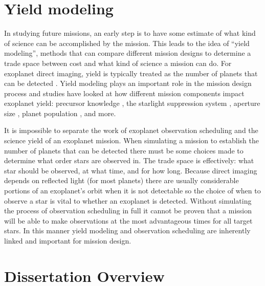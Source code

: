 \section{Yield modeling}
\label{sec:intro_yield_modeling}

In studying future missions, an early step is to have some estimate of what
kind of science can be accomplished by the mission. This leads to the idea of
``yield modeling'', methods that can compare different mission designs to
determine a trade space between cost and what kind of science a mission can do.
For exoplanet direct imaging, yield is typically treated as the number of
planets that can be detected
\citep{brownSingleVisitPhotometric2005,savranskyAnalyzingDesignsPlanetFinding2010,
starkMaximizingExoEarthCandidate2014}. Yield modeling plays an important role
in the mission design process and studies have looked at how different
mission components impact exoplanet yield: precursor knowledge
\citep{morganFasterExoEarth2021}, the starlight suppression system
\citep{savranskyAnalyzingDesignsPlanetFinding2010,morgan19, Stark2016},
aperture size \citep{starkLowerLimitsAperture2015}, planet population
\citep{savranskyComparisonAnalyticalDepth2016}, and more. 

It is impossible to separate the work of exoplanet observation scheduling and
the science yield of an exoplanet mission. When simulating a mission to
establish the number of planets that can be detected there must be some choices
made to determine what order stars are observed in. The trade space is
effectively: what star should be observed, at what time, and for how long. Because
direct imaging depends on reflected light (for most planets) there are usually
considerable portions of an exoplanet's orbit when it is not detectable so the
choice of when to observe a star is vital to whether an exoplanet is detected.
Without simulating the process of observation scheduling in full it cannot be
proven that a mission will be able to make observations at the most
advantageous times for all target stars. In this manner yield modeling and
observation scheduling are inherently linked and important for mission design.


\section{Dissertation Overview}
\label{sec:dis_overview}

